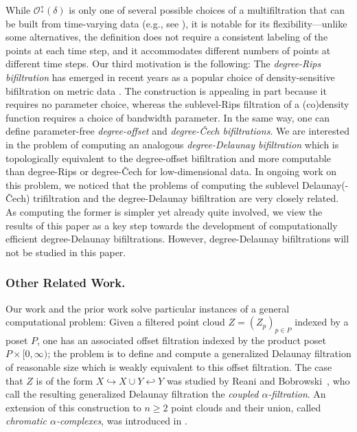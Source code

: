 \documentclass[11pt]{amsart}
\newcommand{\Offset}[0]{\mathcal{O}}
\renewcommand{\subparagraph}[1]{\subsubsection*{\textbf{\textup{#1}}}}
\theoremstyle{plain}
\theoremstyle{definition}
\theoremstyle{remark}
\begin{document}
While $\Offset^{\updownarrow}(\delta)$ is only one of several possible choices of a multifiltration that can be built from time-varying data (e.g., see \cite{kim2021spatiotemporal,strommen2023topological}), it is notable for its flexibility---unlike some alternatives, the definition does not require a consistent labeling of the points at each time step, and it accommodates different numbers of points at different time steps.
%
Our third motivation is the following: The \emph{degree-Rips bifiltration} has emerged in recent years as a popular choice of density-sensitive bifiltration on metric data \cite{rolle2024stable,blumberg2024stability,lesnick2015interactive}. The construction is appealing in part because it requires no parameter choice, whereas the sublevel-Rips filtration of a (co)density function requires a choice of bandwidth parameter. In the same way, one can define parameter-free \emph{degree-offset} and \emph{degree-\v{C}ech bifiltrations}. We are interested in the problem of computing an analogous \emph{degree-Delaunay bifiltration} which is topologically equivalent to the degree-offset bifiltration and more computable than degree-Rips or degree-\v{C}ech for low-dimensional data. In ongoing work on this problem, we noticed that the problems of computing the sublevel Delaunay(-\v{C}ech) trifiltration and the degree-Delaunay bifiltration are very closely related. As computing the former is simpler yet already quite involved, we view the results of this paper as a key step towards the development of computationally efficient degree-Delaunay bifiltrations. However, degree-Delaunay bifiltrations will not be studied in this paper.
%
\subparagraph{Other Related Work.}
Our work and the prior work \cite{alonsoDelaunayBifiltrationsFunctions2024} solve particular instances of a general computational problem: Given a filtered point cloud $Z=(Z_p)_{p\in P}$ indexed by a poset $P$, one has an associated offset filtration indexed by the product poset $P\times [0,\infty)$; the problem is to define and compute a generalized Delaunay filtration of reasonable size which is weakly equivalent to this offset filtration.  The case that $Z$ is of the form $X \hookrightarrow X\cup Y \hookleftarrow Y$ was studied by Reani and Bobrowski~\cite{reaniCoupledAlphaComplex2023}, who call the resulting generalized Delaunay filtration the \emph{coupled $\alpha$-filtration}.  
An extension of this construction to $n\geq 2$ 
point clouds and their union, called \emph{chromatic $\alpha$-complexes}, was introduced in \cite{dimontesanoChromaticAlphaComplexes2024,biswasSizeChromaticDelaunay2022}. 
\end{document}
